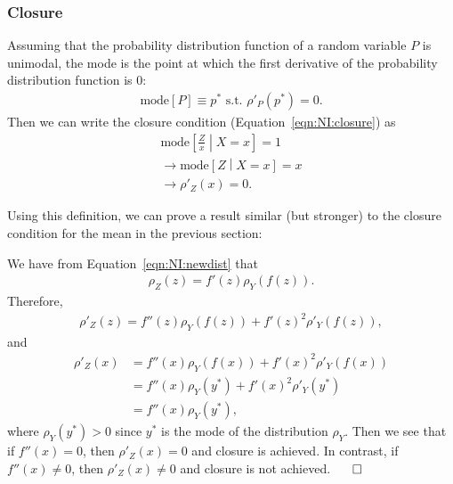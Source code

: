 \subsubsection{Closure}
\label{sec:NI:modeclosuresection}
Assuming that the probability distribution function of a random variable $P$ is unimodal, the mode is the point at which the first derivative of the probability distribution function is 0:
\begin{align}
  \text{mode}[P] \equiv p^* \text{ s.t. } \rho'_P(p^*) = 0.
\label{eqn:NI:modedef}
\end{align}
Then we can write the closure condition (Equation~\ref{eqn:NI:closure}) as
\begin{align}
\text{mode}\left[\frac{Z}{x}\middle| X=x\right] = 1\nonumber\\
\rightarrow \text{mode}\left[Z\middle| X=x\right] = x\nonumber\\
\rightarrow \rho'_Z(x) = 0.
\label{eqn:NI:modeclosuredef}
\end{align}

\noindent Using this definition, we can prove a result similar (but stronger) to the closure condition for the mean in the previous section:

\vspace{5mm}


\vspace{5mm}

 We have from Equation~\ref{eqn:NI:newdist} that
\begin{align}
\rho_Z(z) = f'(z)\rho_Y(f(z)).
\end{align}
Therefore,
\begin{align}
\rho'_Z(z) = f''(z)\rho_Y(f(z))+f'(z)^2\rho'_Y(f(z)),
\end{align}
and
\begin{align}
\rho'_Z(x) &= f''(x)\rho_Y(f(x))+f'(x)^2\rho'_Y(f(x))\nonumber\\
&=f''(x)\rho_Y(y^*)+f'(x)^2\rho'_Y(y^*)\nonumber\\
&=f''(x)\rho_Y(y^*),
\end{align}
where $\rho_Y(y^*)>0$ since $y^*$ is the mode of the distribution $\rho_Y$. Then we see that if $f''(x)=0$, then $\rho'_Z(x)=0$ and closure is achieved.  In contrast, if $f''(x)\ne 0$, then $\rho'_Z(x)\ne 0$ and closure is not achieved. $\hspace{0.5 cm}\Box$

